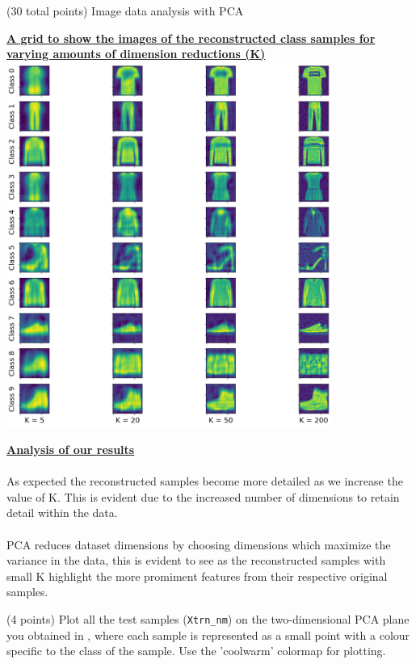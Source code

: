 \documentclass[12pt]{article}
\begin{document}
\begin{question}{(30 total points) Image data analysis with PCA}
\begin{subquestion}
   

      \begin{answerbox}{48em}
        \begin{center}
        \textbf{\underline{A grid to show the images of the reconstructed class samples for}}\\
        \textbf{\underline{varying amounts of dimension reductions (K)}}
        \vspace{0.3cm}\\
         \includegraphics[width=0.8\textwidth]{images/q17.png}
        \end{center}
        \footnotesize{
        \textbf{\underline{Analysis of our results}}\\
\\
        As expected the reconstructed samples become more detailed as we increase the value of K. This is evident due to the increased number of dimensions to retain detail within the data.\\
\\
        PCA reduces dataset dimensions by choosing dimensions which maximize the variance in the data, this is evident to see as the reconstructed samples with small K highlight the more promiment features from their respective original samples.}
      \end{answerbox}
  


   \end{subquestion}
   \begin{subquestion}{(4 points)
       Plot all the test samples (\texttt{Xtrn\_nm}) on the
       two-dimensional PCA plane you obtained in , where each sample is
       represented as a small point with a colour specific to the class of
       the sample.  Use the 'coolwarm' colormap for plotting.
     } \label{Q1.8}



\end{subquestion}
\end{question}
\end{document}
